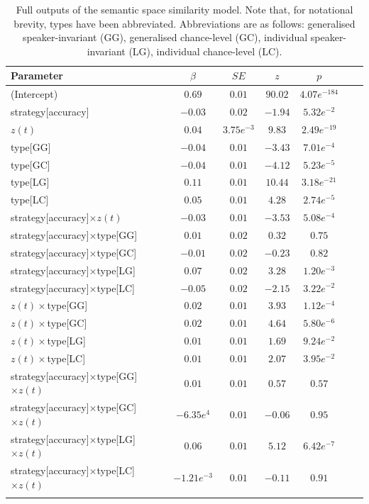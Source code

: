\documentclass[pdflatex,sn-mathphys]{sn-jnl}
\begin{document}
\begin{table}[t]
\begin{center}
\begin{minipage}{\textwidth}
\caption{Full outputs of the semantic space similarity model. Note that, for notational brevity, types have been abbreviated. Abbreviations are as follows: generalised speaker-invariant (GG), generalised chance-level (GC), individual speaker-invariant (LG), individual chance-level (LC).}\label{tab7}
\begin{tabular*}{\textwidth}{@{\extracolsep{\fill}}lcccccc@{\extracolsep{\fill}}}
\toprule%
Parameter & $\beta$ & $SE$ & $z$ & $p$ \\
\midrule
(Intercept) & $0.69$ & $0.01$ & $90.02$ & $4.07e^{-184}$ \\
strategy[accuracy] & $-0.03$ & $0.02$ & $-1.94$ & $5.32e^{-2}$ \\
$z(t)$ & $0.04$ & $3.75e^{-3}$ & $9.83$ & $2.49e^{-19}$ \\
type[GG] & $-0.04$ & $0.01$ & $-3.43$ & $7.01e^{-4}$ \\
type[GC] & $-0.04$ & $0.01$ & $-4.12$ & $5.23e^{-5}$ \\
type[LG] & $0.11$ & $0.01$ & $10.44$ & $3.18e^{-21}$ \\
type[LC] & $0.05$ & $0.01$ & $4.28$ & $2.74e^{-5}$ \\
strategy[accuracy]$\times z(t)$ & $-0.03$ & $0.01$ & $-3.53$ & $5.08e^{-4}$ \\
strategy[accuracy]$\times$type[GG] & $0.01$ & $0.02$ & $0.32$ & $0.75$ \\
strategy[accuracy]$\times$type[GC] & $-0.01$ & $0.02$ & $-0.23$ & $0.82$ \\
strategy[accuracy]$\times$type[LG] & $0.07$ & $0.02$ & $3.28$ & $1.20e^{-3}$ \\
strategy[accuracy]$\times$type[LC] & $-0.05$ & $0.02$ & $-2.15$ & $3.22e^{-2}$ \\
$z(t)\times$type[GG] & $0.02$ & $0.01$ & $3.93$ & $1.12e^{-4}$ \\
$z(t) \times$type[GC] & $0.02$ & $0.01$ & $4.64$ & $5.80e^{-6}$ \\
$z(t) \times$type[LG] & $0.01$ & $0.01$ & $1.69$ & $9.24e^{-2}$ \\
$z(t) \times$type[LC] & $0.01$ & $0.01$ & $2.07$ & $3.95e^{-2}$ \\
strategy[accuracy]$\times$type[GG]$\times z(t)$ & $0.01$ & $0.01$ & $0.57$ & $0.57$ \\
strategy[accuracy]$\times$type[GC]$\times z(t)$ & $-6.35e^{4}$ & $0.01$ & $-0.06$ & $0.95$ \\
strategy[accuracy]$\times$type[LG]$\times z(t)$ & $0.06$ & $0.01$ & $5.12$ & $6.42e^{-7}$ \\
strategy[accuracy]$\times$type[LC]$\times z(t)$ & $-1.21e^{-3}$ & $0.01$ & $-0.11$ & $0.91$ \\
\botrule
\end{tabular*}
\end{minipage}
\end{center}
\end{table}
\end{document}
